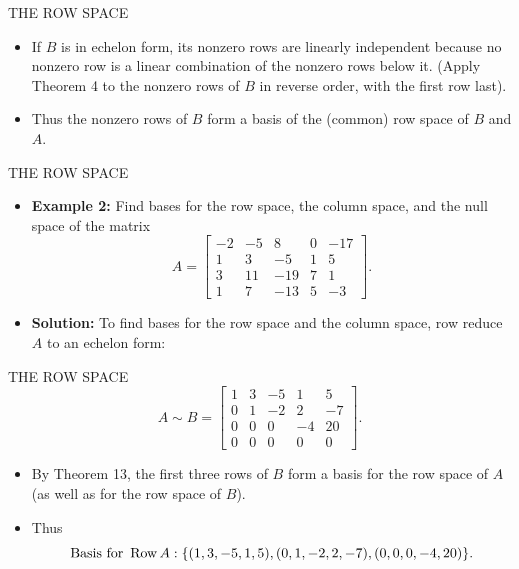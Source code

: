 \begin{frame}[shrink=7]{THE ROW SPACE}
\begin{itemize}
\item If $B$ is in echelon form, its nonzero rows are linearly independent because no nonzero row is a linear combination of the nonzero rows below it. (Apply Theorem 4 to the nonzero rows of $B$ in reverse order, with the first row last).
\item Thus the nonzero rows of $B$ form a basis of the (common) row space of $B$ and $A$.
\end{itemize}
\end{frame}

\begin{frame}[shrink=9]{THE ROW SPACE}
\begin{itemize}
\item \textbf{Example 2:} Find bases for the row space, the column space, and the null space of the matrix
\[
A=\begin{bmatrix}
-2&-5&8&0&-17\\
1&3&-5&1&5\\
3&11&-19&7&1\\
1&7&-13&5&-3
\end{bmatrix}.
\]
\item \textbf{Solution:} To find bases for the row space and the column space, row reduce $A$ to an echelon form:
\end{itemize}
\end{frame}

\begin{frame}[shrink=10]{THE ROW SPACE}
\[
A\sim B=\begin{bmatrix}
1&3&-5&1&5\\
0&1&-2&2&-7\\
0&0&0&-4&20\\
0&0&0&0&0
\end{bmatrix}.
\]
\begin{itemize}
\item By Theorem 13, the first three rows of $B$ form a basis for the row space of $A$ (as well as for the row space of $B$).
\item Thus
\[
\text{Basis for }\operatorname{Row} A:\{(1,3,-5,1,5),(0,1,-2,2,-7),(0,0,0,-4,20)\}.
\]
\end{itemize}
\end{frame}

